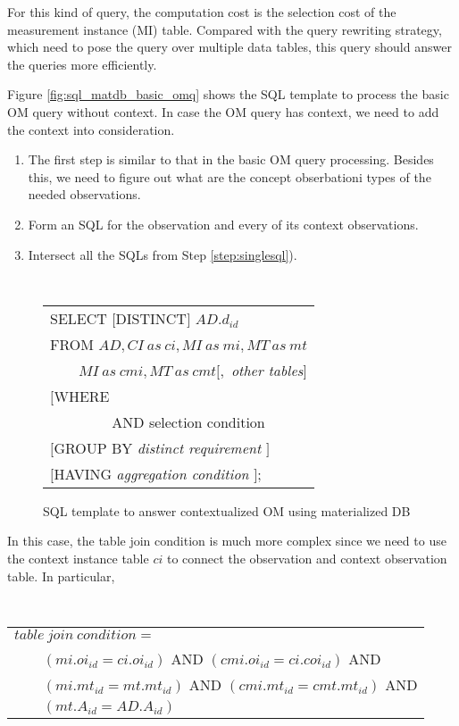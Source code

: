 \documentclass[conference]{IEEEtran}
\begin{document}
For this kind of query, the computation cost is the selection cost of the
measurement instance (MI) table. 
Compared with the query rewriting strategy, which need to pose the
query over multiple data tables, this query should answer the queries
more efficiently. 

Figure \ref{fig:sql_matdb_basic_omq} shows the SQL template to process
the basic OM query without context. In case the OM query has context,
we need to add the context into consideration. 

\begin{enumerate}
\item The first step is similar to that in the basic OM query
  processing. Besides this, we need to figure out what are the concept
  obserbationi types of the needed observations.  
\item \label{step:singlesql} Form an SQL for the observation and every of its context
  observations. 
\item Intersect all the SQLs from Step \ref{step:singlesql}). 
\end{enumerate}


\begin{figure}[htb]
{\tt
\begin{tabular}{l}
SELECT $[$DISTINCT$]$ $AD.d_{id}$\\
FROM $AD, CI~as~ci,MI~as~mi, MT~as~mt$\\
$\qquad MI~as~cmi, MT~as~cmt[,$ {\em other tables}$]$\\
$[$WHERE    {\em table join condition, \\
$\qquad\qquad$ AND selection condition}$]$,\\
$[$GROUP BY {\em distinct requirement} $]$\\
$[$HAVING   {\em aggregation condition} $]$;
\end{tabular}
}
\caption{SQL template to answer contextualized OM using materialized DB}
\label{fig:sql_matdb_context_omq}
\end{figure}

In this case, the table join condition is much more complex since we
need to use the context instance table $ci$ to connect the
observation and context observation table. 
In particular,

\vspace{0.1in}
{\tt 
\begin{tabular}{l}
$table~join~condition=$\\
$\qquad (mi.oi_{id}=ci.oi_{id})$ AND $(cmi.oi_{id}=ci.coi_{id})$ AND\\
$\qquad (mi.mt_{id}=mt.mt_{id})$ AND $(cmi.mt_{id}=cmt.mt_{id})$ AND\\
$\qquad (mt.A_{id}=AD.A_{id})$
\end{tabular}
}
\vspace{0.1in}
\end{document}
